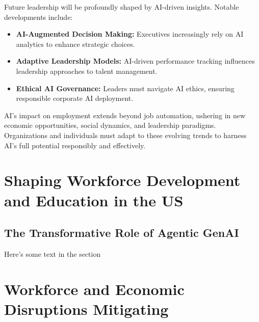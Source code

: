 \documentclass[a4paper,headinclude=on,footinclude=on,12pt,oneside]{scrbook}
\begin{document}

Future leadership will be profoundly shaped by AI-driven insights. Notable developments include:
\begin{itemize}
	\item \textbf{AI-Augmented Decision Making:} Executives increasingly rely on AI analytics to enhance strategic choices.
	\item \textbf{Adaptive Leadership Models:} AI-driven performance tracking influences leadership approaches to talent management.
	\item \textbf{Ethical AI Governance:} Leaders must navigate AI ethics, ensuring responsible corporate AI deployment.
\end{itemize}


AI’s impact on employment extends beyond job automation, ushering in new economic opportunities, social dynamics, and leadership paradigms. Organizations and individuals must adapt to these evolving trends to harness AI’s full potential responsibly and effectively.


\chapter{Shaping Workforce Development and Education in the US}

\section{The Transformative Role of Agentic GenAI}

Here's some text in the section

\chapter{ Workforce and Economic Disruptions Mitigating }
\end{document}
